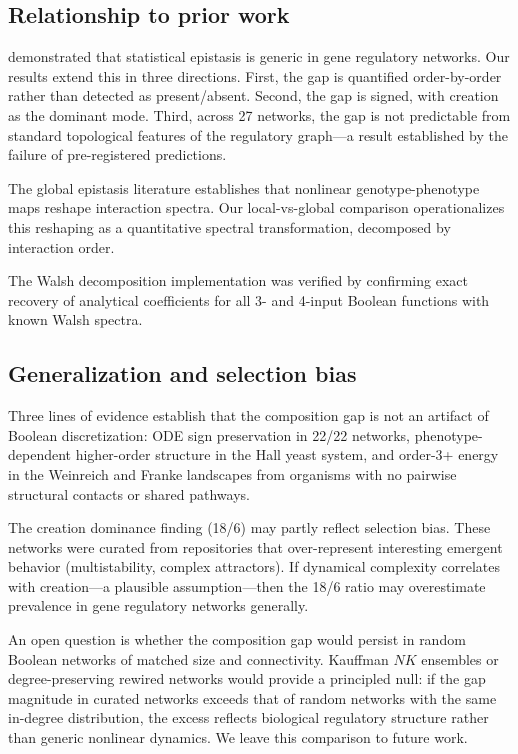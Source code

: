 \documentclass[10pt]{article}
\begin{document}
\subsection{Relationship to prior work}

\citet{gjuvsland2007statistical} demonstrated that
statistical epistasis is generic in gene regulatory networks. Our
results extend this in three directions. First, the gap is quantified
order-by-order rather than detected as present/absent. Second, the
gap is signed, with creation as the dominant mode. Third, across 27
networks, the gap is not predictable from standard topological
features of the regulatory graph---a result established by the
failure of pre-registered predictions.

The global epistasis literature \citep{otwinowski2018inferring, reddy2021global} establishes that nonlinear genotype-phenotype maps
reshape interaction spectra. Our local-vs-global comparison
operationalizes this reshaping as a quantitative spectral
transformation, decomposed by interaction order.

The Walsh decomposition implementation was verified by confirming
exact recovery of analytical coefficients for all 3- and 4-input
Boolean functions with known Walsh spectra.


\subsection{Generalization and selection bias}

Three lines of evidence establish that the composition gap is not an
artifact of Boolean discretization: ODE sign preservation in 22/22
networks, phenotype-dependent higher-order structure in the Hall
yeast system, and order-3+ energy in the Weinreich and Franke
landscapes from organisms with no pairwise structural contacts or
shared pathways.

The creation dominance finding (18/6) may partly reflect selection
bias. These networks were curated from repositories that
over-represent interesting emergent behavior (multistability, complex
attractors). If dynamical complexity correlates with creation---a
plausible assumption---then the 18/6 ratio may overestimate
prevalence in gene regulatory networks generally.

An open question is whether the composition gap would persist in
random Boolean networks of matched size and connectivity. Kauffman
$NK$ ensembles or degree-preserving rewired networks would provide
a principled null: if the gap magnitude in curated networks exceeds
that of random networks with the same in-degree distribution, the
excess reflects biological regulatory structure rather than generic
nonlinear dynamics. We leave this comparison to future work.
\end{document}
